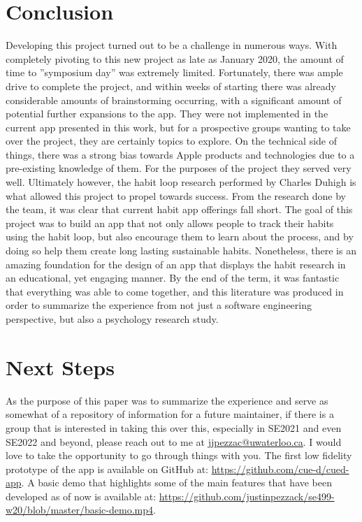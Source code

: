 \section{Conclusion}
Developing this project turned out to be a challenge in numerous ways. With completely pivoting to this new project as late as January 2020, the amount of time to ”symposium day” was extremely limited. Fortunately, there was ample drive to complete the project, and within weeks of starting there was already considerable amounts of brainstorming occurring, with a significant amount of potential further expansions to the app. They were not implemented in the current app presented in this work, but for a prospective groups wanting to take over the project, they are certainly topics to explore. On the technical side of things, there was a strong bias towards Apple products and technologies due to a pre-existing knowledge of them. For the purposes of the project they served very well. Ultimately however, the habit loop research performed by Charles Duhigh is what allowed this project to propel towards success. From the research done by the team, it was clear that current habit app offerings fall short. The goal of this project was to build an app that not only allows people to track their habits using the habit loop, but also encourage them to learn about the process, and by doing so help them create long lasting sustainable habits. Nonetheless, there is an amazing foundation for the design of an app that displays the habit research in an educational, yet engaging manner. By the end of the term, it was fantastic that everything was able to come together, and this literature was produced in order to summarize the experience from not just a software engineering perspective, but also a psychology research study.
\section{Next Steps} 
As the purpose of this paper was to summarize the experience and serve as somewhat of a repository of information for a future maintainer, if there is a group that is interested in taking this over this, especially in SE2021 and even SE2022 and beyond, please reach out to me at \url{jjpezzac@uwaterloo.ca}. I would love to take the opportunity to go through things with you. The first low fidelity prototype of the app is available on GitHub at: \url{https://github.com/cue-d/cued-app}. A basic demo that highlights some of the main features that have been developed as of now is available at: \url{https://github.com/justinpezzack/se499-w20/blob/master/basic-demo.mp4}.